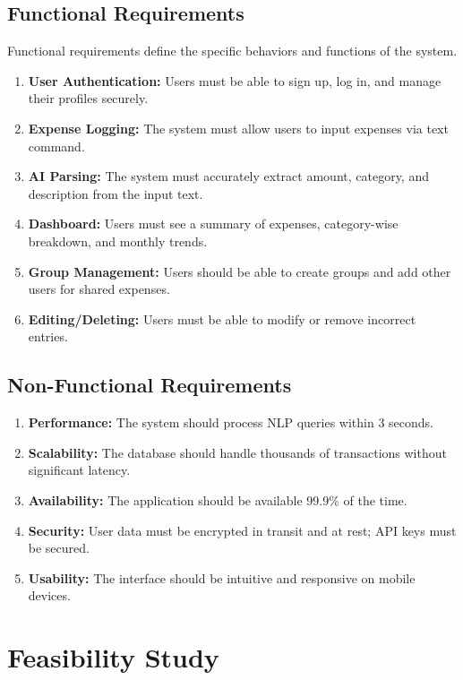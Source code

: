 \subsection{Functional Requirements}
Functional requirements define the specific behaviors and functions of the system.
\begin{enumerate}
    \item \textbf{User Authentication:} Users must be able to sign up, log in, and manage their profiles securely.
    \item \textbf{Expense Logging:} The system must allow users to input expenses via text command.
    \item \textbf{AI Parsing:} The system must accurately extract amount, category, and description from the input text.
    \item \textbf{Dashboard:} Users must see a summary of expenses, category-wise breakdown, and monthly trends.
    \item \textbf{Group Management:} Users should be able to create groups and add other users for shared expenses.
    \item \textbf{Editing/Deleting:} Users must be able to modify or remove incorrect entries.
\end{enumerate}

\subsection{Non-Functional Requirements}
\begin{enumerate}
    \item \textbf{Performance:} The system should process NLP queries within 3 seconds.
    \item \textbf{Scalability:} The database should handle thousands of transactions without significant latency.
    \item \textbf{Availability:} The application should be available 99.9\% of the time.
    \item \textbf{Security:} User data must be encrypted in transit and at rest; API keys must be secured.
    \item \textbf{Usability:} The interface should be intuitive and responsive on mobile devices.
\end{enumerate}

\section{Feasibility Study}

